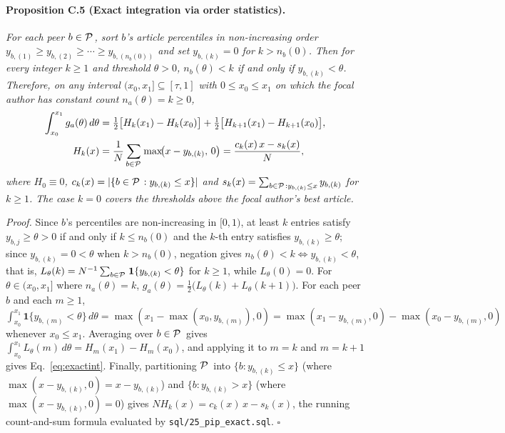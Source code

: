 \documentclass[11pt]{article}
\begin{document}
\paragraph{Proposition C.5 (Exact integration via order statistics).}
\emph{For each peer $b \in {\mathcal{P}\mkern2.5mu}$, sort $b$'s article percentiles in non-increasing order $y_{b,(1)} \ge y_{b,(2)} \ge
\cdots \ge y_{b,(n_b(0))}$ and set $y_{b,(k)} = 0$ for $k > n_b(0)$. Then for every integer $k \ge 1$ and threshold
$\theta > 0$, $n_b(\theta) < k$ if and only if $y_{b,(k)} < \theta$. Therefore, on any interval $(x_0, x_1] \subseteq
[\tau, 1]$ with $0 \le x_0 \le x_1$ on which the focal author has constant count $n_a(\theta) = k \ge 0$,}
\begin{equation}
  \begin{aligned}
  \int_{x_0}^{x_1} g_a(\theta)\, d\theta &= \tfrac12\bigl[H_k(x_1) - H_k(x_0)\bigr] + \tfrac12\bigl[H_{k+1}(x_1) -
  H_{k+1}(x_0)\bigr], \\
  H_k(x) &= \frac{1}{N}\sum_{b \in {\mathcal{P}\mkern2.5mu}} \max\!\bigl(x - y_{b,(k)},\, 0\bigr)
  = \frac{c_k(x)\, x - s_k(x)}{N},
  \end{aligned}
  \label{eq:exactint}
\end{equation}
\emph{where $H_0 \equiv 0$, $c_k(x) = |\{b \in {\mathcal{P}\mkern2.5mu} : y_{b,(k)} \le x\}|$ and $s_k(x) = \sum_{b \in {\mathcal{P}\mkern2.5mu} : y_{b,(k)}
\le x} y_{b,(k)}$ for $k \ge 1$. The case $k = 0$ covers the thresholds above the focal author's best article.}

\noindent\emph{Proof.}
Since $b$'s percentiles are non-increasing in $[0, 1)$, at least $k$ entries satisfy $y_{b,j} \ge \theta > 0$ if and only
if $k \le n_b(0)$ and the $k$-th entry satisfies $y_{b,(k)} \ge \theta$; since $y_{b,(k)} = 0 < \theta$ when $k >
n_b(0)$, negation gives $n_b(\theta) < k \iff y_{b,(k)} < \theta$, that is, $L_\theta(k) = N^{-1}\sum_{b \in {\mathcal{P}\mkern2.5mu}}
\mathbf{1}\{y_{b,(k)} < \theta\}$ for $k \ge 1$, while $L_\theta(0) = 0$. For $\theta \in (x_0, x_1]$ where $n_a(\theta) =
k$, $g_a(\theta) = \tfrac12\bigl(L_\theta(k) + L_\theta(k+1)\bigr)$. For each peer $b$ and each $m \ge 1$,
$\int_{x_0}^{x_1} \mathbf{1}\{y_{b,(m)} < \theta\}\, d\theta = \max(x_1 - \max(x_0, y_{b,(m)}), 0) = \max(x_1 - y_{b,(m)},
0) - \max(x_0 - y_{b,(m)}, 0)$ whenever $x_0 \le x_1$. Averaging over $b \in {\mathcal{P}\mkern2.5mu}$ gives $\int_{x_0}^{x_1} L_\theta(m)\,
d\theta = H_m(x_1) - H_m(x_0)$, and applying it to $m = k$ and $m = k + 1$ gives Eq.~\ref{eq:exactint}. Finally,
partitioning ${\mathcal{P}\mkern2.5mu}$ into $\{b : y_{b,(k)} \le x\}$ (where $\max(x - y_{b,(k)}, 0) = x - y_{b,(k)}$) and $\{b : y_{b,(k)} >
x\}$ (where $\max(x - y_{b,(k)}, 0) = 0$) gives $N H_k(x) = c_k(x)\, x - s_k(x)$, the running count-and-sum formula
evaluated by \texttt{sql/25\_pip\_exact.sql}. \hfill$\square$
\end{document}

